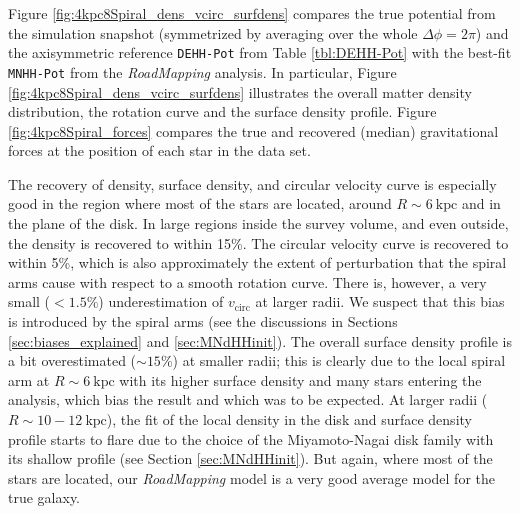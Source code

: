 \documentclass[iop,revtex4,numberedappendix,appendixfloats]{emulateapj}
\newcommand{\RM}{{\sl RoadMapping}}
\begin{document}
Figure \ref{fig:4kpc8Spiral_dens_vcirc_surfdens} compares the true potential from the simulation snapshot (symmetrized by averaging over the whole $\Delta\phi=2\pi$) and the axisymmetric reference \texttt{DEHH-Pot} from Table \ref{tbl:DEHH-Pot} with the best-fit \texttt{MNHH-Pot} from the \RM{} analysis. In particular, Figure \ref{fig:4kpc8Spiral_dens_vcirc_surfdens} illustrates the overall matter density distribution, the rotation curve and the surface density profile. Figure \ref{fig:4kpc8Spiral_forces} compares the true and recovered (median) gravitational forces at the position of each star in the data set.

The recovery of density, surface density, and circular velocity curve is especially good in the region where most of the stars are located, around $R\sim6~\text{kpc}$ and in the plane of the disk. In large regions inside the survey volume, and even outside, the density is recovered to within 15\%. The circular velocity curve is recovered to within 5\%, which is also approximately the extent of perturbation that the spiral arms cause with respect to a smooth rotation curve. There is, however, a very small ($<1.5\%$) underestimation of $v_\text{circ}$ at larger radii. We suspect that this bias is introduced by the spiral arms (see the discussions in Sections \ref{sec:biases_explained} and \ref{sec:MNdHHinit}). The overall surface density profile is a bit overestimated ($\sim 15\%$) at smaller radii; this is clearly due to the local spiral arm at $R\sim6~\text{kpc}$ with its higher surface density and many stars entering the analysis, which bias the result and which was to be expected. At larger radii ($R\sim10-12~\text{kpc}$), the fit of the local density in the disk and surface density profile starts to flare due to the choice of the Miyamoto-Nagai disk family with its shallow profile (see Section \ref{sec:MNdHHinit}). But again, where most of the stars are located, our \RM{} model is a very good average model for the true galaxy.
\end{document}
